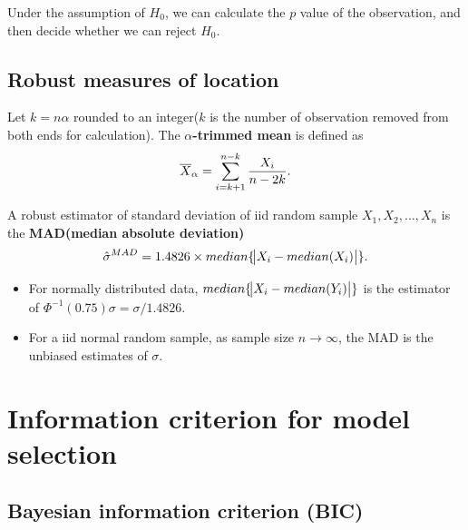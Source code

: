 \begin{refsection}
\begin{remark}
	Under the assumption of $H_0$, we can calculate the $p$ value of the observation, and then decide whether we can reject $H_0$.
\end{remark}

\subsection{Robust measures of location}

\begin{definition}
Let $k = n\alpha$ rounded to an integer($k$ is the number of observation removed from both ends for calculation). The \textbf{ $\alpha$-trimmed mean} is defined as
$$\overline{X}_\alpha = \sum_{i=k+1}^{n-k}\frac{X_i}{n-2k}.$$
\end{definition}


\begin{definition}\cite[122]{ruppert2015statistics}\label{ch:theory-of-statistics:def:medianabsoluteDeviation}
A robust estimator of standard deviation of iid random sample $X_1,X_2,...,X_n$ is the \textbf{MAD(median absolute deviation)}
	$$\hat{\sigma}^{MAD} = 1.4826\times median\{\abs{X_i - median(X_i)}\}.$$
\end{definition}

\begin{remark}[interpretation]\hfill
\begin{itemize}
	\item For normally distributed data, $median\{\abs{X_i - median(Y_i)}\}$ is the estimator of $\Phi^{-1}(0.75)\sigma = \sigma/1.4826$.
	\item For a iid normal random sample, as sample size $n\to \infty$, the MAD  is the unbiased estimates of $\sigma$.
\end{itemize}
\end{remark}


\section{Information criterion for model selection}

\subsection{Bayesian information criterion (BIC)}


\end{refsection}
